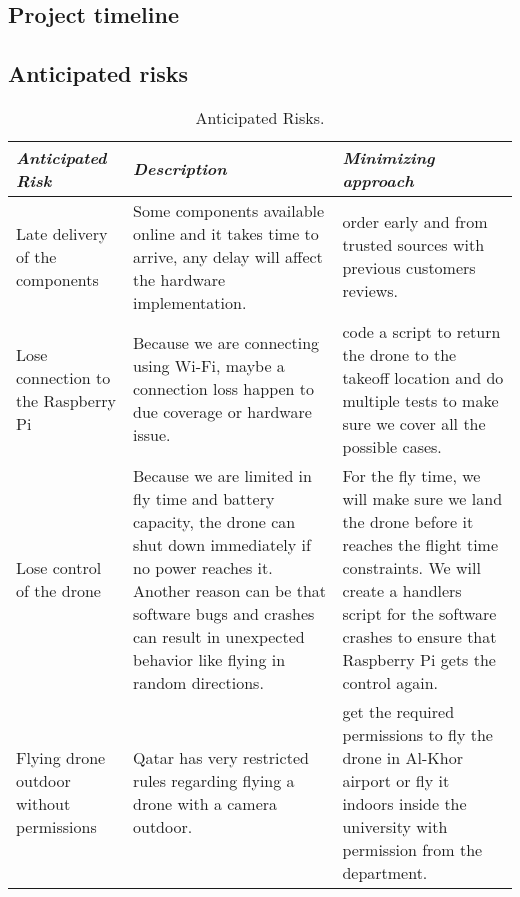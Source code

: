 \documentclass[../main.tex]{subfiles}
\begin{document}
\subsection{Project timeline}



\subsection{Anticipated risks}

\begin{table}[H]
	\centering
	\caption{Anticipated Risks.}
	\label{tab:Anticipated Risks}
        \begin{tabularx}{\textwidth}{ X X X }
		\toprule
		\textit{Anticipated Risk} 
		& \textit{Description} 
		& \textit{Minimizing approach} \\
		
		\midrule
		
		Late delivery of the components 
		& Some components available online 
		and it takes time to arrive, 
		any delay will affect the hardware implementation.
		& order early and from trusted sources with previous 
		customers reviews. \\
		
		Lose connection to the Raspberry Pi
		& Because we are connecting using Wi-Fi, maybe a connection loss 
		happen to due coverage or hardware issue.
		& code a script to return the drone to the takeoff location 
		and do multiple tests to make sure we cover all the possible cases. \\
		
		Lose control of the drone
		& Because we are limited in fly time and battery capacity, 
		the drone can shut down immediately if no power reaches it.
		Another reason can be that software bugs and crashes can 
		result in unexpected behavior like flying in random directions.
		& For the fly time, we will make sure we land the drone before it reaches the flight time constraints.
		We will create a handlers script for the software crashes 
		to ensure that Raspberry Pi gets the control again.  \\
		
		Flying drone outdoor without permissions 
		& Qatar has very restricted rules regarding flying a drone 
		with a camera outdoor.
		& get the required permissions to fly the drone in 
		Al-Khor airport or fly it indoors inside the university with permission from the department. \\
		
		\bottomrule		
	\end{tabularx}
\end{table}
\end{document}
